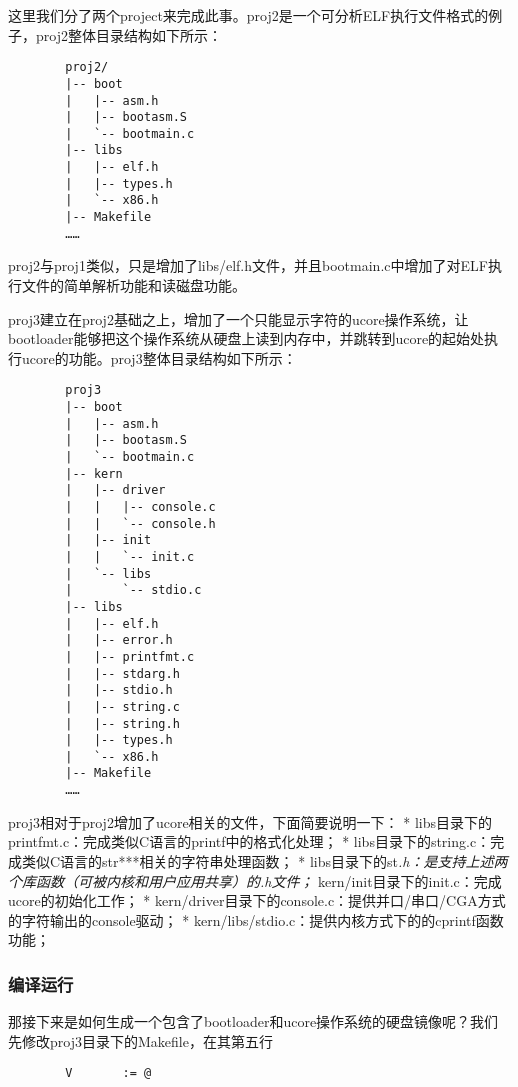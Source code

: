 这里我们分了两个project来完成此事。proj2是一个可分析ELF执行文件格式的例子，proj2整体目录结构如下所示：

\begin{lstlisting}
        proj2/
        |-- boot
        |   |-- asm.h
        |   |-- bootasm.S
        |   `-- bootmain.c
        |-- libs
        |   |-- elf.h
        |   |-- types.h
        |   `-- x86.h
        |-- Makefile
        ……
\end{lstlisting}

proj2与proj1类似，只是增加了libs/elf.h文件，并且bootmain.c中增加了对ELF执行文件的简单解析功能和读磁盘功能。

proj3建立在proj2基础之上，增加了一个只能显示字符的ucore操作系统，让bootloader能够把这个操作系统从硬盘上读到内存中，并跳转到ucore的起始处执行ucore的功能。proj3整体目录结构如下所示：

\begin{lstlisting}
        proj3
        |-- boot
        |   |-- asm.h
        |   |-- bootasm.S
        |   `-- bootmain.c
        |-- kern
        |   |-- driver
        |   |   |-- console.c
        |   |   `-- console.h
        |   |-- init
        |   |   `-- init.c
        |   `-- libs
        |       `-- stdio.c
        |-- libs
        |   |-- elf.h
        |   |-- error.h
        |   |-- printfmt.c
        |   |-- stdarg.h
        |   |-- stdio.h
        |   |-- string.c
        |   |-- string.h
        |   |-- types.h
        |   `-- x86.h
        |-- Makefile
        ……
\end{lstlisting}

proj3相对于proj2增加了ucore相关的文件，下面简要说明一下： *
libs目录下的printfmt.c：完成类似C语言的printf中的格式化处理； *
libs目录下的string.c：完成类似C语言的str***相关的字符串处理函数； *
libs目录下的st\emph{.h：是支持上述两个库函数（可被内核和用户应用共享）的.h文件；
} kern/init目录下的init.c：完成ucore的初始化工作； *
kern/driver目录下的console.c：提供并口/串口/CGA方式的字符输出的console驱动；
* kern/libs/stdio.c：提供内核方式下的的cprintf函数功能；

\subsubsection{编译运行}\label{ux7f16ux8bd1ux8fd0ux884c}

那接下来是如何生成一个包含了bootloader和ucore操作系统的硬盘镜像呢？我们先修改proj3目录下的Makefile，在其第五行

\begin{lstlisting}
        V       := @
\end{lstlisting}

